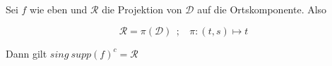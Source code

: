 \begin{corollary}
\label{cor:psi_ast_misst_sing_supp}
Sei $f$ wie eben und $\mathcal{R}$ die Projektion von $\mathcal{D}$ auf die  Ortskomponente. Also

\begin{equation*}
    \mathcal{R} = \pi (\mathcal{D})~~;~~~~
    \pi : (t,s) \mapsto t
\end{equation*}

Dann gilt $sing ~supp (f)^c = \mathcal{R}$
\end{corollary}
